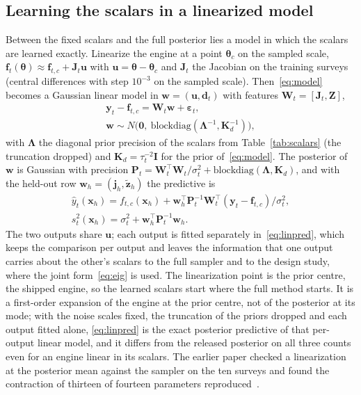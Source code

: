 \subsection{Learning the scalars in a linearized model}\label{sec:method-linear}

Between the fixed scalars and the full posterior lies a model in which the scalars are learned exactly. Linearize the engine
at a point $\boldsymbol\theta_c$ on the sampled scale, $\mathbf f_t(\boldsymbol\theta)\approx\mathbf f_{t,c}+\mathbf J_t\mathbf u$ with
$\mathbf u=\boldsymbol\theta-\boldsymbol\theta_c$ and $\mathbf J_t$ the Jacobian on the training surveys (central differences
with step $10^{-3}$ on the sampled scale). Then~\eqref{eq:model} becomes a Gaussian linear model in $\mathbf w=(\mathbf u,\mathbf
d_t)$ with features $\mathbf W_t=[\mathbf J_t,\mathbf Z]$,
\begin{equation}
\begin{gathered}
\mathbf y_t-\mathbf f_{t,c}=\mathbf W_t\mathbf w+\boldsymbol\varepsilon_t,\\
\mathbf w\sim N\big(\mathbf 0,\ \mathrm{blockdiag}(\boldsymbol\Lambda^{-1},\mathbf K_d^{-1})\big),
\end{gathered}
\label{eq:linear}
\end{equation}
with $\boldsymbol\Lambda$ the diagonal prior precision of the scalars from Table~\ref{tab:scalars} (the truncation dropped) and
$\mathbf K_d=\tau_t^{-2}\mathbf I$ for the prior of~\eqref{eq:model}. The posterior of $\mathbf w$ is Gaussian with precision
$\mathbf P_t=\mathbf W_t^{\top}\mathbf W_t/\sigma_t^2+\mathrm{blockdiag}(\boldsymbol\Lambda,\mathbf K_d)$, and with the held-out row
$\mathbf w_h=(\mathbf j_h,\tilde{\mathbf z}_h)$ the predictive is
\begin{equation}
\begin{gathered}
\hat y_t(\mathbf x_h)=f_{t,c}(\mathbf x_h)+\mathbf w_h^{\top}\mathbf P_t^{-1}\mathbf W_t^{\top}(\mathbf y_t-\mathbf f_{t,c})/\sigma_t^2,\\
s_t^2(\mathbf x_h)=\sigma_t^2+\mathbf w_h^{\top}\mathbf P_t^{-1}\mathbf w_h .
\end{gathered}
\label{eq:linpred}
\end{equation}
The two outputs share $\mathbf u$; each output is fitted separately in~\eqref{eq:linpred}, which keeps the comparison per
output and leaves the information that one output carries about the other's scalars to the full sampler and to the design
study, where the joint form~\eqref{eq:eig} is used. The linearization point is the prior centre, the shipped engine, so the
learned scalars start where the full method starts. It is a first-order expansion of the engine at the prior centre, not of
the posterior at its mode; with the noise scales fixed, the truncation of the priors dropped and each output fitted alone,
\eqref{eq:linpred} is the exact posterior predictive of that per-output linear model, and it differs from the released
posterior on all three counts even for an engine linear in its scalars. The earlier paper checked a linearization at the
posterior mean against the sampler on the ten surveys and found the contraction of thirteen of fourteen parameters
reproduced~\cite{cb002}.

